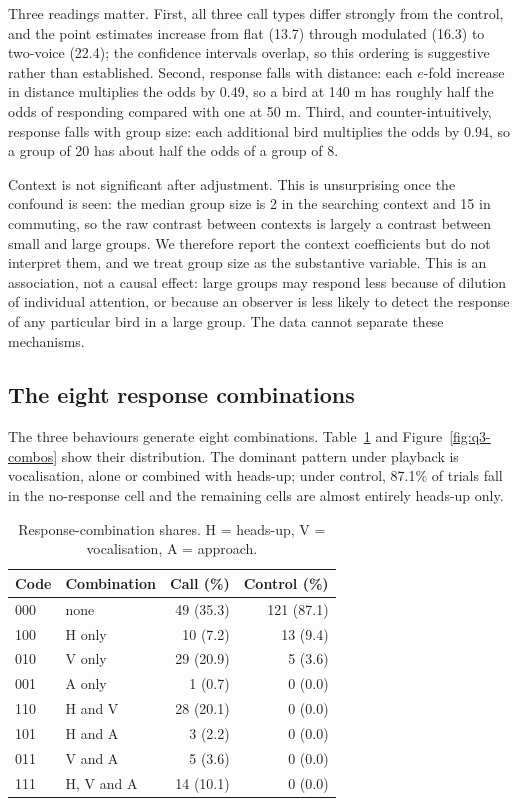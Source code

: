 Three readings matter. First, all three call types differ strongly from the control, and the
point estimates increase from flat (13.7) through modulated (16.3) to two-voice (22.4); the
confidence intervals overlap, so this ordering is suggestive rather than established. Second,
response falls with distance: each $e$-fold increase in distance multiplies the odds by 0.49,
so a bird at 140 m has roughly half the odds of responding compared with one at 50 m. Third,
and counter-intuitively, response falls with group size: each additional bird multiplies the
odds by 0.94, so a group of 20 has about half the odds of a group of 8.

Context is not significant after adjustment. This is unsurprising once the confound is seen:
the median group size is 2 in the searching context and 15 in commuting, so the raw contrast
between contexts is largely a contrast between small and large groups. We therefore report the
context coefficients but do not interpret them, and we treat group size as the substantive
variable. This is an association, not a causal effect: large groups may respond less because of
dilution of individual attention, or because an observer is less likely to detect the response
of any particular bird in a large group. The data cannot separate these mechanisms.

\subsection{The eight response combinations}\label{sec:q3-combos}

The three behaviours generate eight combinations. Table~\ref{tab:q3-combos} and
Figure~\ref{fig:q3-combos} show their distribution. The dominant pattern under playback is
vocalisation, alone or combined with heads-up; under control, 87.1\% of trials fall in the
no-response cell and the remaining cells are almost entirely heads-up only.

\begin{table}[htbp]
  \centering
  \caption{Response-combination shares. H = heads-up, V = vocalisation, A = approach.}\label{tab:q3-combos}
  \small
  \begin{tabular}{llrr}
    \toprule
    Code & Combination & Call (\%) & Control (\%) \\
    \midrule
    000 & none & 49 (35.3) & 121 (87.1) \\
    100 & H only & 10 (7.2) & 13 (9.4) \\
    010 & V only & 29 (20.9) & 5 (3.6) \\
    001 & A only & 1 (0.7) & 0 (0.0) \\
    110 & H and V & 28 (20.1) & 0 (0.0) \\
    101 & H and A & 3 (2.2) & 0 (0.0) \\
    011 & V and A & 5 (3.6) & 0 (0.0) \\
    111 & H, V and A & 14 (10.1) & 0 (0.0) \\
    \bottomrule
  \end{tabular}
\end{table}


